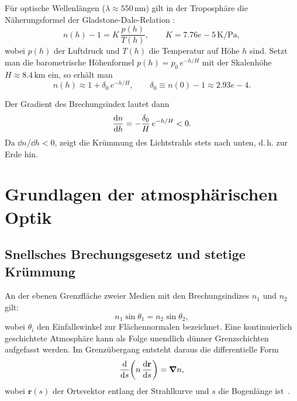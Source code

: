 \documentclass[12pt,a4paper]{article}
\providecommand{\SI}[2]{\ensuremath{#1\,#2}}
\providecommand{\num}[1]{#1}
\providecommand{\kilo}{\mathrm{k}}
\providecommand{\nano}{\mathrm{n}}
\providecommand{\per}{/}
\providecommand{\metre}{\mathrm{m}}
\providecommand{\pascal}{\mathrm{Pa}}
\providecommand{\kelvin}{\mathrm{K}}
\begin{document}
Für optische Wellenlängen ($\lambda \approx \SI{550}{\nano\metre}$)
gilt in der Troposphäre die Näherungsformel der Gladstone-Dale-Relation
\citep{PenndorfRefractivity1957}:
\begin{equation}
  n(h) - 1 = K \, \frac{p(h)}{T(h)},
  \qquad
  K = \SI{7.76e-5}{\kelvin\per\pascal},
  \label{eq:gladstone_dale}
\end{equation}
wobei $p(h)$ der Luftdruck und $T(h)$ die Temperatur auf Höhe $h$ sind.
Setzt man die barometrische Höhenformel
$p(h) = p_0\,e^{-h/H}$ mit der Skalenhöhe
$H \approx \SI{8.4}{\kilo\metre}$ ein, so erhält man
\begin{equation}
  n(h) \approx 1 + \delta_0\,e^{-h/H},
  \qquad
  \delta_0 \equiv n(0)-1 \approx \num{2.93e-4}.
  \label{eq:n_exp}
\end{equation}

Der Gradient des Brechungsindex lautet dann
\begin{equation}
  \dv{n}{h} = -\frac{\delta_0}{H}\,e^{-h/H} < 0.
  \label{eq:gradient_n}
\end{equation}
Da $\dd n/\dd h < 0$, zeigt die Krümmung des Lichtstrahls
stets nach unten, d.\,h. zur Erde hin.

\section{Grundlagen der atmosphärischen Optik}
\label{sec:grundlagen}

\subsection{Snellsches Brechungsgesetz und stetige Krümmung}

An der ebenen Grenzfläche zweier Medien mit den
Brechungsindizes $n_1$ und $n_2$ gilt:
\begin{equation}
  n_1 \sin\theta_1 = n_2 \sin\theta_2,
  \label{eq:snell}
\end{equation}
wobei $\theta_i$ den Einfallswinkel zur Flächennormalen bezeichnet.
Eine kontinuierlich geschichtete Atmosphäre kann als
Folge unendlich dünner Grenzschichten aufgefasst werden.
Im Grenzübergang entsteht daraus die differentielle Form
\begin{equation}
  \dv{}{s}\!\left(n\,\dv{\mathbf{r}}{s}\right) = \grad n,
  \label{eq:strahlgleichung_allg}
\end{equation}
wobei $\mathbf{r}(s)$ der Ortsvektor entlang der Strahlkurve
und $s$ die Bogenlänge ist~\citep{BornWolf1999}.
\end{document}
